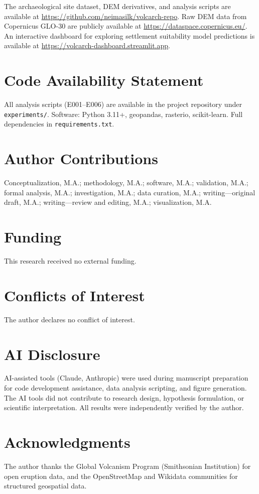 \documentclass[12pt,a4paper]{article}
\begin{document}
The archaeological site dataset, DEM derivatives, and analysis scripts are available at \url{https://github.com/neimasilk/volcarch-repo}. Raw DEM data from Copernicus GLO-30 are publicly available at \url{https://dataspace.copernicus.eu/}. An interactive dashboard for exploring settlement suitability model predictions is available at \url{https://volcarch-dashboard.streamlit.app}.

\section*{Code Availability Statement}

All analysis scripts (E001--E006) are available in the project repository under \texttt{experiments/}. Software: Python 3.11+, geopandas, rasterio, scikit-learn. Full dependencies in \texttt{requirements.txt}.

\section*{Author Contributions}

Conceptualization, M.A.; methodology, M.A.; software, M.A.; validation, M.A.; formal analysis, M.A.; investigation, M.A.; data curation, M.A.; writing---original draft, M.A.; writing---review and editing, M.A.; visualization, M.A.

\section*{Funding}

This research received no external funding.

\section*{Conflicts of Interest}

The author declares no conflict of interest.

\section*{AI Disclosure}

AI-assisted tools (Claude, Anthropic) were used during manuscript preparation for code development assistance, data analysis scripting, and figure generation. The AI tools did not contribute to research design, hypothesis formulation, or scientific interpretation. All results were independently verified by the author.

\section*{Acknowledgments}

The author thanks the Global Volcanism Program (Smithsonian Institution) for open eruption data, and the OpenStreetMap and Wikidata communities for structured geospatial data.



\end{document}
